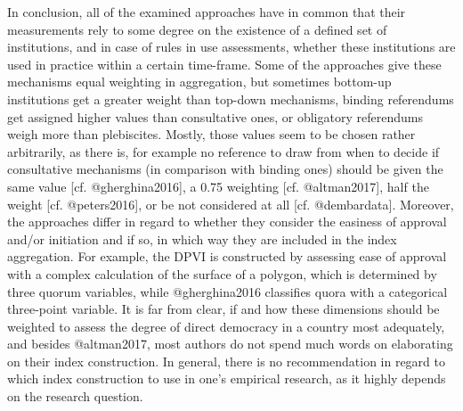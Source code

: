 \documentclass[]{article}
\begin{document}
In conclusion, all of the examined approaches have in common that their
measurements rely to some degree on the existence of a defined set of
institutions, and in case of rules in use assessments, whether these
institutions are used in practice within a certain time-frame. Some of
the approaches give these mechanisms equal weighting in aggregation, but
sometimes bottom-up institutions get a greater weight than top-down
mechanisms, binding referendums get assigned higher values than
consultative ones, or obligatory referendums weigh more than
plebiscites. Mostly, those values seem to be chosen rather arbitrarily,
as there is, for example no reference to draw from when to decide if
consultative mechanisms (in comparison with binding ones) should be
given the same value {[}cf. @gherghina2016{]}, a 0.75 weighting {[}cf.
@altman2017{]}, half the weight {[}cf. @peters2016{]}, or be not
considered at all {[}cf. @dembardata{]}. Moreover, the approaches differ
in regard to whether they consider the easiness of approval and/or
initiation and if so, in which way they are included in the index
aggregation. For example, the DPVI is constructed by assessing ease of
approval with a complex calculation of the surface of a polygon, which
is determined by three quorum variables, while @gherghina2016 classifies
quora with a categorical three-point variable. It is far from clear, if
and how these dimensions should be weighted to assess the degree of
direct democracy in a country most adequately, and besides @altman2017,
most authors do not spend much words on elaborating on their index
construction. In general, there is no recommendation in regard to which
index construction to use in one's empirical research, as it highly
depends on the research question.
\end{document}

